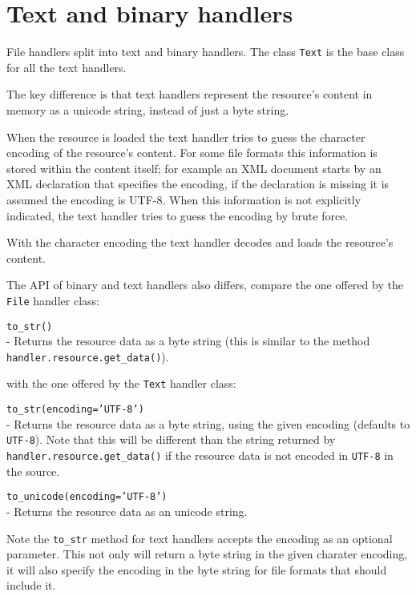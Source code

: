 \section{Text and binary handlers}

File handlers split into text and binary handlers. The class {\tt Text}
is the base class for all the text handlers.

The key difference is that text handlers represent the resource's content
in memory as a unicode string, instead of just a byte string.

When the resource is loaded the text handler tries to guess the character
encoding of the resource's content. For some file formats this information
is stored within the content itself; for example an XML document starts
by an XML declaration that specifies the encoding, if the declaration is
missing it is assumed the encoding is UTF-8. When this information is not
explicitly indicated, the text handler tries to guess the encoding by
brute force.

With the character encoding the text handler decodes and loads the resource's
content.

The API of binary and text handlers also differs, compare the one offered
by the {\tt File} handler class:

\begin{api}
  {\tt to\_str()}\\
  - Returns the resource data as a byte string (this is similar to the
    method {\tt handler.resource.get\_data()}).
\end{api}

with the one offered by the {\tt Text} handler class:

\begin{api}
  {\tt to\_str(encoding='UTF-8')}\\
  - Returns the resource data as a byte string, using the given encoding
  (defaults to {\tt UTF-8}). Note that this will be different than the
  string returned by {\tt handler.resource.get\_data()} if the resource
  data is not encoded in {\tt UTF-8} in the source.

  {\tt to\_unicode(encoding='UTF-8')}\\
  - Returns the resource data as an unicode string.
\end{api}

Note the {\tt to\_str} method for text handlers accepts the encoding as
an optional parameter. This not only will return a byte string in the
given charater encoding, it will also specify the encoding in the byte
string for file formats that should include it.

